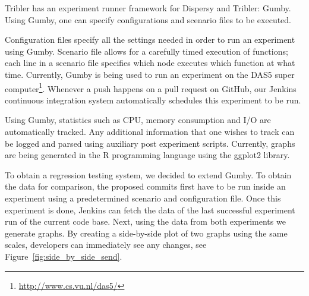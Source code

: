 Tribler has an experiment runner framework for Dispersy and Tribler: Gumby.
Using Gumby, one can specify configurations and scenario files to be executed.

Configuration files specify all the settings needed in order to run an experiment using Gumby.
Scenario file allows for a carefully timed execution of functions; each line in a scenario file specifies which node executes which function at what time. 
Currently, Gumby is being used to run an experiment on the DAS5 super computer\footnote{\url{http://www.cs.vu.nl/das5/}}.
Whenever a push happens on a pull request on GitHub, our Jenkins continuous integration system automatically schedules this experiment to be run.

Using Gumby, statistics such as CPU, memory consumption and I/O are automatically tracked.
Any additional information that one wishes to track can be logged and parsed using auxiliary post experiment scripts.
Currently, graphs are being generated in the R programming language using the ggplot2 library.

To obtain a regression testing system, we decided to extend Gumby.
To obtain the data for comparison, the proposed commits first have to be run inside an experiment using a predetermined scenario and configuration file.
Once this experiment is done, Jenkins can fetch the data of the last successful experiment run of the current code base.
Next, using the data from both experiments we generate graphs.
By creating a side-by-side plot of two graphs using the same scales, developers can immediately see any changes, see Figure~\ref{fig:side_by_side_send}.